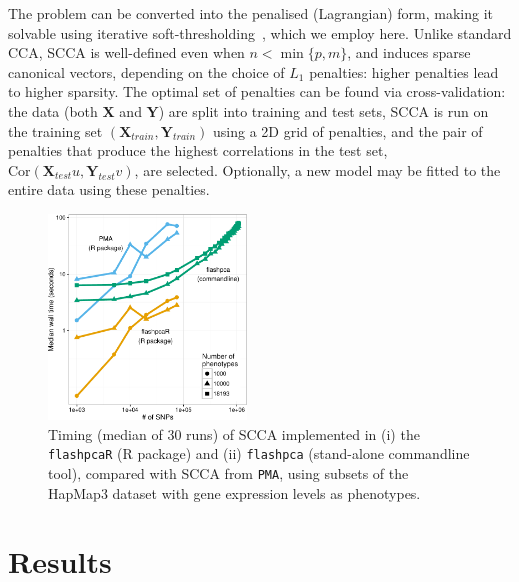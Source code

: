 \documentclass{bioinfo}
\begin{document}
\begin{methods}
The problem can be converted into the penalised (Lagrangian) form, making it
solvable using iterative soft-thresholding~\citep{Parkhomenko2009}, which we
employ here.  Unlike standard CCA, SCCA is well-defined even when $n{<}\min
\{p, m\}$, and induces sparse canonical vectors, depending on the choice of
$L_1$ penalties: higher penalties lead to higher sparsity. The optimal set
of penalties can be found via cross-validation: the data (both $\mathbf{X}$
and $\mathbf{Y}$) are split into training and test sets, SCCA is run on the
training set $(\mathbf{X}_{train}, \mathbf{Y}_{train})$ using a 2D grid of
penalties, and the pair of penalties that produce the highest correlations
in the test set, $\mbox{Cor}(\mathbf{X}_{test} u, \mathbf{Y}_{test} v)$,
are selected.  Optionally, a new model may be fitted to the entire data using
these penalties. 

\enlargethispage{6pt}

\end{methods}

\begin{figure}[!tpb]
\centerline{\includegraphics[width=0.47\textwidth]{scca_timing-crop.pdf}}
\caption{
Timing (median of 30 runs) of SCCA implemented in (i) the \texttt{flashpcaR}
(\textsf{R} package) and (ii) \texttt{flashpca} (stand-alone commandline tool),
compared with SCCA from \texttt{PMA}, using subsets of the HapMap3 dataset with gene
expression levels as phenotypes.
}
\label{fig:01}
\end{figure}

\section{Results}
\end{document}

